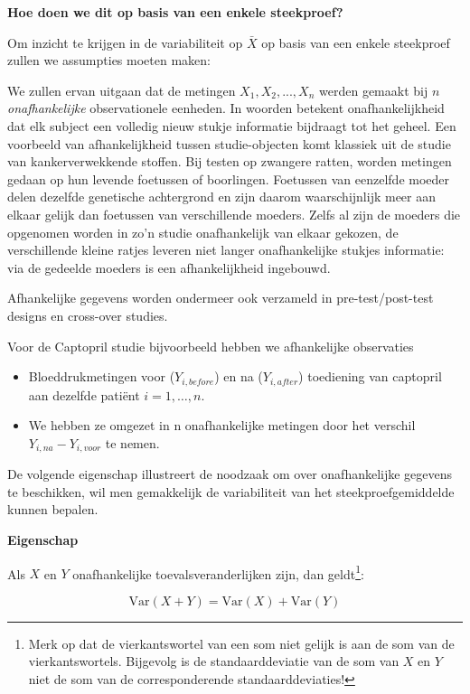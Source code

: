 \documentclass[
  dutch,
  letterpaper,
  12pt]{book}
\providecommand{\tightlist}{%
  \setlength{\itemsep}{0pt}\setlength{\parskip}{0pt}}
\theoremstyle{definition}
\theoremstyle{definition}
\theoremstyle{definition}
\theoremstyle{remark}
\begin{document}
\textbf{Hoe doen we dit op basis van een enkele steekproef?}

Om inzicht te krijgen in de variabiliteit op \(\bar X\) op basis van een
enkele steekproef zullen we assumpties moeten maken:

We zullen ervan uitgaan dat de metingen \(X_1, X_2, ..., X_n\) werden
gemaakt bij \(n\) \emph{onafhankelijke} observationele eenheden. In
woorden betekent onafhankelijkheid dat elk subject een volledig nieuw
stukje informatie bijdraagt tot het geheel. Een voorbeeld van
afhankelijkheid tussen studie-objecten komt klassiek uit de studie van
kankerverwekkende stoffen. Bij testen op zwangere ratten, worden
metingen gedaan op hun levende foetussen of boorlingen. Foetussen van
eenzelfde moeder delen dezelfde genetische achtergrond en zijn daarom
waarschijnlijk meer aan elkaar gelijk dan foetussen van verschillende
moeders. Zelfs al zijn de moeders die opgenomen worden in zo'n studie
onafhankelijk van elkaar gekozen, de verschillende kleine ratjes leveren
niet langer onafhankelijke stukjes informatie: via de gedeelde moeders
is een afhankelijkheid ingebouwd.

Afhankelijke gegevens worden ondermeer ook verzameld in
pre-test/post-test designs en cross-over studies.

Voor de Captopril studie bijvoorbeeld hebben we afhankelijke observaties

\begin{itemize}
\tightlist
\item
  Bloeddrukmetingen voor (\(Y_{i,before}\)) en na (\(Y_{i,after}\))
  toediening van captopril aan dezelfde patiënt \(i=1,\ldots,n\).
\item
  We hebben ze omgezet in n onafhankelijke metingen door het verschil
  \(Y_{i,na}-Y_{i,voor}\) te nemen.
\end{itemize}

De volgende eigenschap illustreert de noodzaak om over onafhankelijke
gegevens te beschikken, wil men gemakkelijk de variabiliteit van het
steekproefgemiddelde kunnen bepalen.

\textbf{Eigenschap}

Als \(X\) en \(Y\) onafhankelijke toevalsveranderlijken zijn, dan
geldt\footnote{Merk op dat de vierkantswortel van een som niet gelijk is
  aan de som van de vierkantswortels. Bijgevolg is de standaarddeviatie
  van de som van \(X\) en \(Y\) niet de som van de corresponderende
  standaarddeviaties!}:

\begin{equation*}
\text{Var}(X+Y) = \text{Var}(X) + \text{Var}(Y)
\end{equation*}
\end{document}
